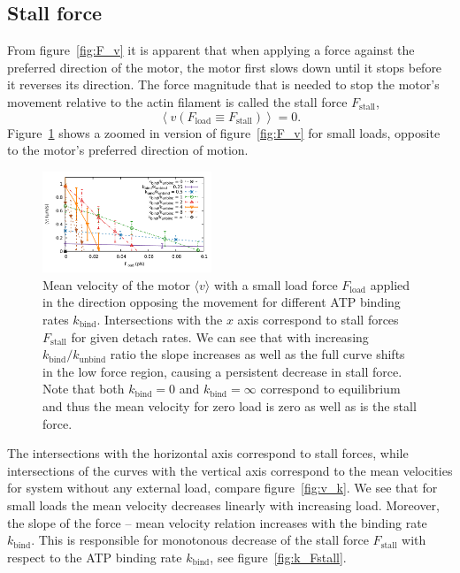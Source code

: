 \documentclass[aps,pre,twocolumn,showpacs,showkeys,superscriptaddress,floatfix]{revtex4-1}
\begin{document}
\subsection{Stall force}
From figure~\ref{fig:F_v} it is apparent that when applying a force against the preferred direction of the motor, 
the motor first slows down until it stops before it reverses its direction. 
The force magnitude that is needed to stop the motor's movement relative to the actin filament is called the stall force $F_\text{stall}$,  
\[
\left\langle v ( F_\text{load} \equiv F_\text{stall} ) \right\rangle = 0 .
\]
Figure~\ref{fig:F_v_zoom} shows a zoomed in version of figure~\ref{fig:F_v} for small loads, opposite to the motor's preferred direction of motion. 
\begin{figure}[t]
\centering
\includegraphics[width=0.45\textwidth,height=!]{F_v_zoom}
\caption{
\label{fig:F_v_zoom} 
Mean velocity of the motor $\langle v \rangle$ with a small load force $F_\text{load}$ applied in the direction opposing the movement for different ATP binding rates $k_\text{bind}$.
Intersections with the $x$ axis correspond to stall forces $F_\text{stall}$ for given detach rates. 
We can see that with increasing $k_\text{bind}/k_\text{unbind}$ ratio the slope increases as well as the full curve shifts in the low force region, 
causing a persistent decrease in stall force. 
Note that both $k_\text{bind} = 0 $ and $k_\text{bind} = \infty$ correspond to equilibrium and thus the mean velocity for zero load is zero as well as is the stall force.  
}
\end{figure}
The intersections with the horizontal axis correspond to stall forces,  
while intersections of the curves with the vertical axis correspond to the mean velocities for system without any external load, compare figure~\ref{fig:v_k}. 
We see that for small loads the mean velocity decreases linearly with increasing load. 
Moreover, the slope of the force -- mean velocity relation increases with the binding rate $k_\text{bind}$. 
This is responsible for monotonous decrease of the stall force $F_\text{stall}$ with respect to the ATP binding rate $k_\text{bind}$, see figure~\ref{fig:k_Fstall}.
\end{document}
